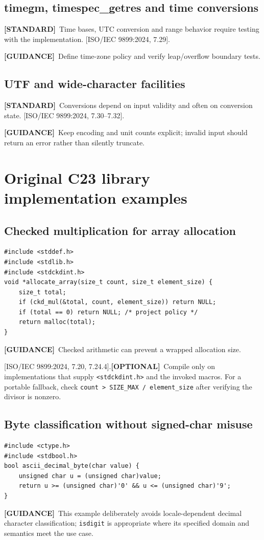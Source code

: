 \documentclass[10pt,letterpaper,oneside]{report}
\newcommand{\refcl}[1]{\textsf{\footnotesize[ISO/IEC 9899:2024, #1]}}
\newcommand{\standard}{\textbf{[STANDARD]}}
\newcommand{\optional}{\textbf{[OPTIONAL]}}
\newcommand{\guidance}{\textbf{[GUIDANCE]}}
\begin{document}
\section{timegm, timespec\_getres and time conversions}
\standard\ Time bases, UTC conversion and range behavior require testing with the implementation. \refcl{7.29}.\par\guidance\ Define time-zone policy and verify leap/overflow boundary tests.

\section{UTF and wide-character facilities}
\standard\ Conversions depend on input validity and often on conversion state. \refcl{7.30--7.32}.\par\guidance\ Keep encoding and unit counts explicit; invalid input should return an error rather than silently truncate.

\chapter{Original C23 library implementation examples}
\section{Checked multiplication for array allocation}
\begin{lstlisting}
#include <stddef.h>
#include <stdlib.h>
#include <stdckdint.h>
void *allocate_array(size_t count, size_t element_size) {
    size_t total;
    if (ckd_mul(&total, count, element_size)) return NULL;
    if (total == 0) return NULL; /* project policy */
    return malloc(total);
}
\end{lstlisting}
\guidance\ Checked arithmetic can prevent a wrapped allocation size.\par\refcl{7.20, 7.24.4}.\optional\ Compile only on implementations that supply \texttt{<stdckdint.h>} and the invoked macros. For a portable fallback, check \texttt{count > SIZE\_MAX / element\_size} after verifying the divisor is nonzero.
\section{Byte classification without signed-char misuse}
\begin{lstlisting}
#include <ctype.h>
#include <stdbool.h>
bool ascii_decimal_byte(char value) {
    unsigned char u = (unsigned char)value;
    return u >= (unsigned char)'0' && u <= (unsigned char)'9';
}
\end{lstlisting}
\guidance\ This example deliberately avoids locale-dependent decimal character classification; \texttt{isdigit} is appropriate where its specified domain and semantics meet the use case.
\end{document}
